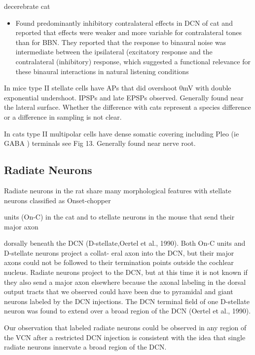 \documentclass[10pt,a4paper]{article}
\begin{document}
\citep{YoungBrownell:1976} decerebrate cat


\begin{itemize}
\item Found predominantly inhibitory contralateral effects in DCN of cat and
  reported that effects were weaker and more variable for contralateral tones
  than for BBN.  They reported that the response to binaural noise was
  intermediate between the ipsilateral (excitatory response and the
  contralateral (inhibitory) response, which suggested a functional relevance
  for these binaural interactions in natural listening conditions
\end{itemize} 

In mice \citep{OertelWuEtAl:1990} type II stellate cells have APs that did
overshoot 0mV with double exponential undershoot. IPSPs and late EPSPs
observed. Generally found near the lateral surface. Whether the difference with
cats represent a species difference or a difference in sampling is not clear.

In cats type II multipolar cells \citep{Cant:1981} have dense somatic covering
including Pleo (ie GABA ) terminals see Fig 13.  Generally found near nerve
root.

\subsection{\citep{DoucetRyugo:1997} Radiate Neurons}

Radiate neurons in the rat share many morphological features with stellate
neurons classified as Onset-chopper

units (On-C) in the cat \citep{SmithRhode:1989} and to stellate neurons in the
mouse that send their major axon

dorsally beneath the DCN (D-stellate,Oertel et al., 1990). Both On-C units and
D-stellate neurons project a collat- eral axon into the DCN, but their major
axons could not be followed to their termination points outside the cochlear
nucleus. Radiate neurons project to the DCN, but at this time it is not known if
they also send a major axon elsewhere because the axonal labeling in the dorsal
output tracts that we observed could have been due to pyramidal and giant
neurons labeled by the DCN injections. The DCN terminal field of one D-stellate
neuron was found to extend over a broad region of the DCN (Oertel et al., 1990).

Our observation that labeled radiate neurons could be observed in any region of
the VCN after a restricted DCN injection is consistent with the idea that single radiate neurons innervate a
broad region of the DCN.
\end{document}

